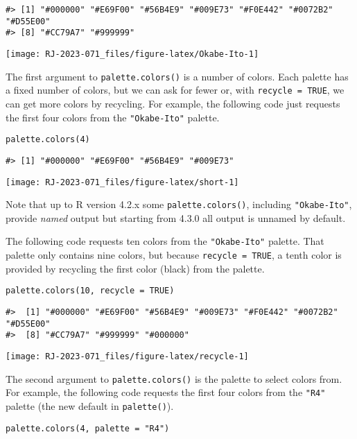 \begin{verbatim}
#> [1] "#000000" "#E69F00" "#56B4E9" "#009E73" "#F0E442" "#0072B2" "#D55E00"
#> [8] "#CC79A7" "#999999"
\end{verbatim}

\texttt{[image: RJ-2023-071\_files/figure-latex/Okabe-Ito-1]}

The first argument to \texttt{palette.colors()} is a number of colors.
Each palette has a fixed number of colors, but we can ask for fewer or,
with \texttt{recycle\ =\ TRUE}, we can get more colors by recycling.
For example, the following code just requests the first four colors
from the \texttt{"Okabe-Ito"} palette.

\begin{verbatim}
palette.colors(4)
\end{verbatim}

\begin{verbatim}
#> [1] "#000000" "#E69F00" "#56B4E9" "#009E73"
\end{verbatim}

\texttt{[image: RJ-2023-071\_files/figure-latex/short-1]}

Note that up to R version 4.2.x some \texttt{palette.colors()}, including \texttt{"Okabe-Ito"},
provide \emph{named} output but starting from 4.3.0 all output is unnamed by default.

The following code requests ten colors from the \texttt{"Okabe-Ito"} palette.
That palette only contains nine colors, but because \texttt{recycle\ =\ TRUE},
a tenth color is provided by recycling the first color (black) from the palette.

\begin{verbatim}
palette.colors(10, recycle = TRUE)
\end{verbatim}

\begin{verbatim}
#>  [1] "#000000" "#E69F00" "#56B4E9" "#009E73" "#F0E442" "#0072B2" "#D55E00"
#>  [8] "#CC79A7" "#999999" "#000000"
\end{verbatim}

\texttt{[image: RJ-2023-071\_files/figure-latex/recycle-1]}

The second argument to \texttt{palette.colors()} is the palette to select colors
from. For example, the following code requests the first four colors
from the \texttt{"R4"} palette (the new default in \texttt{palette()}).

\begin{verbatim}
palette.colors(4, palette = "R4")
\end{verbatim}

